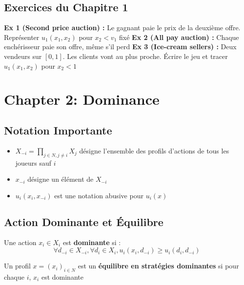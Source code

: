 \subsection{Exercices du Chapitre 1} %
\textbf{Ex 1 (Second price auction) :} Le gagnant paie le prix de la deuxième offre. Représenter $u_1(x_1, x_2)$ pour $x_2 < v_1$ fixé %
\textbf{Ex 2 (All pay auction) :} Chaque enchérisseur paie son offre, même s'il perd %
\textbf{Ex 3 (Ice-cream sellers) :} Deux vendeurs sur $[0, 1]$. Les clients vont au plus proche. Écrire le jeu et tracer $u_1(x_1, x_2)$ pour $x_2 < 1$ %


\newpage
\section{Chapter 2: Dominance} %

\subsection{Notation Importante} %
\begin{itemize}
    \item $X_{-i} = \prod_{j \in N, j \ne i} X_j$ désigne l'ensemble des profils d'actions de tous les joueurs sauf $i$ %
    \item $x_{-i}$ désigne un élément de $X_{-i}$ %
    \item $u_i(x_i, x_{-i})$ est une notation abusive pour $u_i(x)$ %
\end{itemize}

\subsection{Action Dominante et Équilibre} %
\begin{definition}
Une action $x_i \in X_i$ est \textbf{dominante} si : %
$$\forall d_{-i} \in X_{-i}, \forall d_i \in X_i, u_i(x_i, d_{-i}) \ge u_i(d_i, d_{-i})$$ %
\end{definition}

\begin{definition}
Un profil $x = (x_i)_{i \in N}$ est un \textbf{équilibre en stratégies dominantes} si pour chaque $i$, $x_i$ est dominante %
\end{definition}

